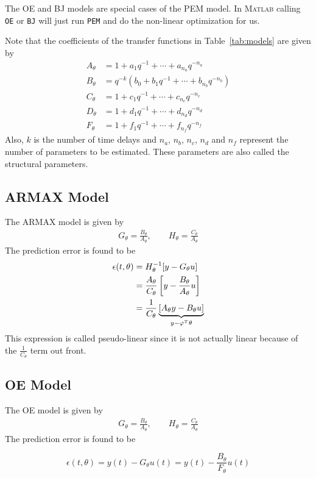 The OE and BJ models are special cases of the PEM model.
In \textsc{Matlab} calling \texttt{OE} or \texttt{BJ} will just run \texttt{PEM} and do the non-linear optimization for us.

Note that the coefficients of the transfer functions in Table~\ref{tab:models} are given by
\begin{align*}
A_\theta &= 1+a_1q^{-1}+\cdots+a_{n_a}q^{-n_a} \\
B_\theta &= q^{-k}(b_0+b_1q^{-1}+\cdots+b_{n_b}q^{-n_b}) \\
C_\theta &= 1+c_1q^{-1}+\cdots+c_{n_c}q^{-n_c} \\
D_\theta &= 1+d_1q^{-1}+\cdots+d_{n_d}q^{-n_d} \\
F_\theta &= 1+f_1q^{-1}+\cdots+f_{n_f}q^{-n_f}
\end{align*}
Also, $k$ is the number of time delays and $n_a$, $n_b$, $n_c$, $n_d$ and $n_f$ represent the number of parameters to be estimated.
These parameters are also called the structural parameters.

\subsection{ARMAX Model}
The ARMAX model is given by
\begin{align*}
G_\theta = \frac{B_\theta}{A_\theta}, \qquad H_\theta = \frac{C_\theta}{A_\theta}
\end{align*}
The prediction error is found to be
\begin{align*}
\epsilon(t,\theta) &= H_\theta^{-1}[y-G_\theta u] \\
&= \frac{A_\theta}{C_\theta}\left[y-\frac{B_\theta}{A_\theta}u\right] \\
&= \frac{1}{C_\theta}\underbrace{\left[A_\theta y-B_\theta u\right]}_{y-\varphi^T\theta}
\end{align*}
This expression is called pseudo-linear since it is not actually linear because of the $\frac{1}{C_\theta}$ term out front.

\subsection{OE Model}
The OE model is given by
\begin{align*}
G_\theta = \frac{B_\theta}{A_\theta}, \qquad H_\theta = \frac{C_\theta}{A_\theta}
\end{align*}
The prediction error is found to be

\begin{equation*}
\epsilon(t,\theta) = y(t)-G_\theta u(t) = y(t)-\frac{B_\theta}{F_\theta}u(t)
\end{equation*}


